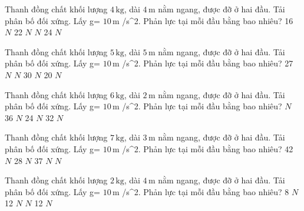 \begin{ex}
Thanh đồng chất khối lượng $4\,\text{kg}$, dài $4\,\text{m}$ nằm ngang, được đỡ ở hai đầu. Tải phân bố đối xứng. Lấy g= $10\,\text{m}$ /s^2. Phản lực tại mỗi đầu bằng bao nhiêu?
\choice
{16 $N$}
{22 $N$}
{ $N$}
{24 $N$}
\end{ex}

\begin{ex}
Thanh đồng chất khối lượng $5\,\text{kg}$, dài $5\,\text{m}$ nằm ngang, được đỡ ở hai đầu. Tải phân bố đối xứng. Lấy g= $10\,\text{m}$ /s^2. Phản lực tại mỗi đầu bằng bao nhiêu?
\choice
{27 $N$}
{ $N$}
{30 $N$}
{20 $N$}
\end{ex}

\begin{ex}
Thanh đồng chất khối lượng $6\,\text{kg}$, dài $2\,\text{m}$ nằm ngang, được đỡ ở hai đầu. Tải phân bố đối xứng. Lấy g= $10\,\text{m}$ /s^2. Phản lực tại mỗi đầu bằng bao nhiêu?
\choice
{ $N$}
{36 $N$}
{24 $N$}
{32 $N$}
\end{ex}

\begin{ex}
Thanh đồng chất khối lượng $7\,\text{kg}$, dài $3\,\text{m}$ nằm ngang, được đỡ ở hai đầu. Tải phân bố đối xứng. Lấy g= $10\,\text{m}$ /s^2. Phản lực tại mỗi đầu bằng bao nhiêu?
\choice
{42 $N$}
{28 $N$}
{37 $N$}
{ $N$}
\end{ex}

\begin{ex}
Thanh đồng chất khối lượng $2\,\text{kg}$, dài $4\,\text{m}$ nằm ngang, được đỡ ở hai đầu. Tải phân bố đối xứng. Lấy g= $10\,\text{m}$ /s^2. Phản lực tại mỗi đầu bằng bao nhiêu?
\choice
{8 $N$}
{12 $N$}
{ $N$}
{12 $N$}
\end{ex}

